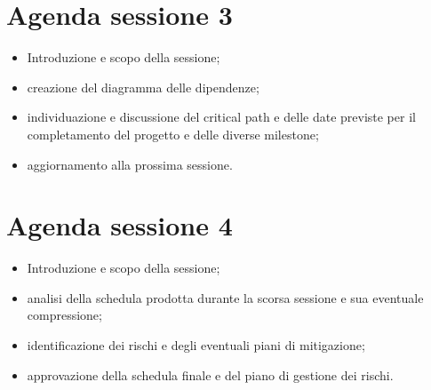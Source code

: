 \documentclass[a4paper,12pt]{article}
\begin{document}
\section*{Agenda sessione 3}
\begin{itemize}
    \item Introduzione e scopo della sessione;
    \item creazione del diagramma delle dipendenze;
    \item individuazione e discussione del critical path e delle date previste per il completamento del progetto e
    delle diverse milestone;
    \item aggiornamento alla prossima sessione.
\end{itemize}

\section*{Agenda sessione 4}
\begin{itemize}
    \item Introduzione e scopo della sessione;
    \item analisi della schedula prodotta durante la scorsa sessione e sua eventuale compressione;
    \item identificazione dei rischi e degli eventuali piani di mitigazione;
    \item approvazione della schedula finale e del piano di gestione dei rischi.
\end{itemize}
\end{document}

